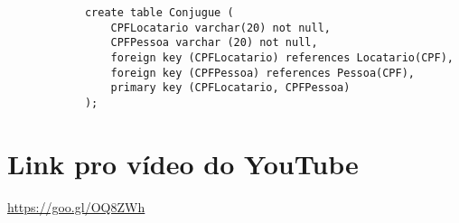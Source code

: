 \documentclass{article}
\begin{document}
\begin{lstlisting}
            create table Conjugue (
            	CPFLocatario varchar(20) not null,
            	CPFPessoa varchar (20) not null,
            	foreign key (CPFLocatario) references Locatario(CPF),
            	foreign key (CPFPessoa) references Pessoa(CPF),
            	primary key (CPFLocatario, CPFPessoa)
            );
        \end{lstlisting}
    
    \section{Link pro vídeo do YouTube}
        \textcolor{blue}{\underline{\url{https://goo.gl/OQ8ZWh}}}
    
\end{document}

